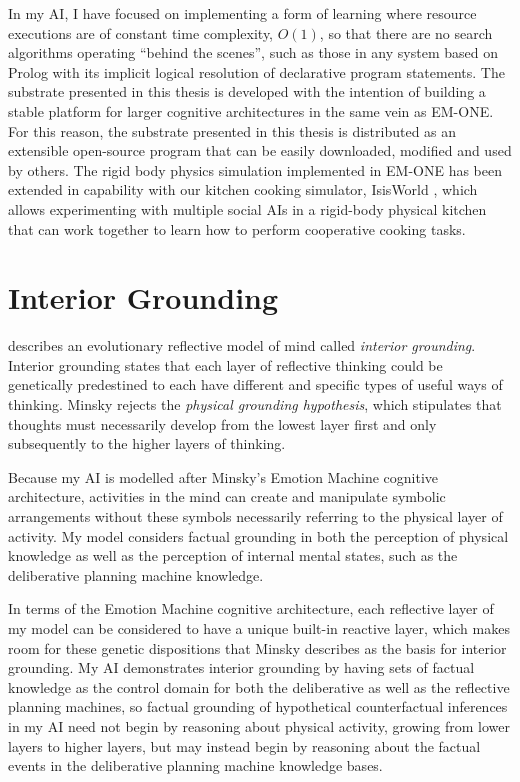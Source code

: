 In my AI, I have focused on implementing a form of learning where
resource executions are of constant time complexity, $O(1)$, so that
there are no search algorithms operating ``behind the scenes'', such
as those in any system based on Prolog with its implicit logical
resolution of declarative program statements.  The substrate presented
in this thesis is developed with the intention of building a stable
platform for larger cognitive architectures in the same vein as
EM-ONE.  For this reason, the substrate presented in this thesis is
distributed as an extensible open-source program that can be easily
downloaded, modified and used by others.  The rigid body physics
simulation implemented in EM-ONE has been extended in capability with
our kitchen cooking simulator, IsisWorld \cite[]{smith:2010}, which
allows experimenting with multiple social AIs in a rigid-body physical
kitchen that can work together to learn how to perform cooperative
cooking tasks.

\section{Interior Grounding}

\cite{minsky:2005} describes an evolutionary reflective model of mind
called \emph{interior grounding}.  Interior grounding states that each
layer of reflective thinking could be genetically predestined to each
have different and specific types of useful ways of thinking.  Minsky
rejects the \emph{physical grounding hypothesis}, which stipulates
that thoughts must necessarily develop from the lowest layer first and
only subsequently to the higher layers of thinking.

Because my AI is modelled after Minsky's Emotion Machine cognitive
architecture, activities in the mind can create and manipulate
symbolic arrangements without these symbols necessarily referring to
the physical layer of activity.  My model considers factual grounding
in both the perception of physical knowledge as well as the perception
of internal mental states, such as the deliberative planning machine
knowledge.

In terms of the Emotion Machine cognitive architecture, each
reflective layer of my model can be considered to have a unique
built-in reactive layer, which makes room for these genetic
dispositions that Minsky describes as the basis for interior
grounding.  My AI demonstrates interior grounding by having sets of
factual knowledge as the control domain for both the deliberative as
well as the reflective planning machines, so factual grounding of
hypothetical counterfactual inferences in my AI need not begin by
reasoning about physical activity, growing from lower layers to higher
layers, but may instead begin by reasoning about the factual events in
the deliberative planning machine knowledge bases.

